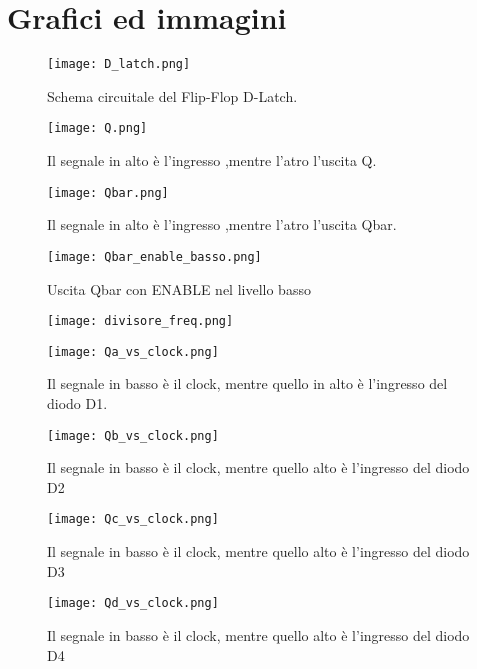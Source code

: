 \section{Grafici ed immagini}

\begin{figure}[h]
	\centering
	\texttt{[image: D\_latch.png]}
	\caption{Schema circuitale del Flip-Flop D-Latch.}
	\label{f:D-Latch}
\end{figure}

\begin{figure}[h]
	\centering
	\texttt{[image: Q.png]}
	\caption{Il segnale in alto è l'ingresso ,mentre l'atro l'uscita Q.}
	\label{f:Q}
\end{figure}

\begin{figure}[h]
	\centering
	\texttt{[image: Qbar.png]}
	\caption{Il segnale in alto è l'ingresso ,mentre l'atro l'uscita Qbar.}
	\label{f:Qbar}
\end{figure}

\begin{figure}[h]
	\centering
	\texttt{[image: Qbar\_enable\_basso.png]}
	\caption{Uscita Qbar con ENABLE nel livello basso}
	\label{f:Qbar_enable_basso}
\end{figure}

\begin{figure}[h]
	\centering
	\texttt{[image: divisore\_freq.png]}
	\caption{}
	\label{f:contatore}
\end{figure}

\begin{figure}[h]
	\centering
	\texttt{[image: Qa\_vs\_clock.png]}
	\caption{Il segnale in basso è il clock, mentre quello in alto è  l'ingresso del diodo D1.}
	\label{f:Qa_vs_clock}
\end{figure}

\begin{figure}[h]
	\centering
	\texttt{[image: Qb\_vs\_clock.png]}
	\caption{Il segnale in basso è il clock, mentre quello alto è  l'ingresso del diodo D2}
	\label{f:Qb_vs_clock}
\end{figure}

\begin{figure}[h]
	\centering
	\texttt{[image: Qc\_vs\_clock.png]}
	\caption{Il segnale in basso è il clock, mentre quello alto è  l'ingresso del diodo D3}
	\label{f:Qc_vs_clock}
\end{figure}

\begin{figure}[h]
	\centering
	\texttt{[image: Qd\_vs\_clock.png]}
	\caption{Il segnale in basso è il clock, mentre quello alto è  l'ingresso del diodo D4}
	\label{f:Qd_vs_clock}
\end{figure}

